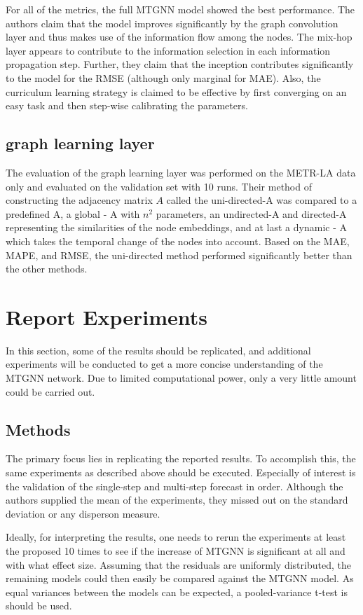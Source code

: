 \documentclass[letterpaper, twocolumn,11pt]{article}
\begin{document}
    For all of the metrics, the full MTGNN model showed the best performance.
    The authors claim that the model improves significantly by the graph convolution layer and thus makes use of the information flow among the nodes.
    The mix-hop layer appears to contribute to the information selection in each information propagation step.
    Further, they claim that the inception contributes significantly to the model for the RMSE (although only marginal for MAE).
    Also, the curriculum learning strategy is claimed to be effective by first converging on an easy task and then step-wise calibrating the parameters.

    \subsection{graph learning layer}
    The evaluation of the graph learning layer was performed on the METR-LA data only and evaluated on the validation set with 10 runs.
    Their method of constructing the adjacency matrix $A$ called the uni-directed-A was compared to a predefined A, a global - A with $n^2$ parameters, an undirected-A and directed-A representing the similarities of the node embeddings, and at last a dynamic - A which takes the temporal change of the nodes into account.
    Based on the MAE, MAPE, and RMSE, the uni-directed method performed significantly better than the other methods.


    \section{Report Experiments}
    In this section, some of the results should be replicated, and additional experiments will be conducted to get a more concise understanding of the MTGNN network.
    Due to limited computational power, only a very little amount could be carried out.

    \subsection{Methods}
    The primary focus lies in replicating the reported results.
    To accomplish this, the same experiments as described above should be executed.
    Especially of interest is the validation of the single-step and multi-step forecast in order.
    Although the authors supplied the mean of the experiments, they missed out on the standard deviation or any disperson measure.

    Ideally, for interpreting the results, one needs to rerun the experiments at least the proposed 10 times to see if the increase of MTGNN is significant at all and with what effect size.
    Assuming that the residuals are uniformly distributed, the remaining models could then easily be compared against the MTGNN model. As equal variances between the models can be expected, a pooled-variance t-test is should be used.
\end{document}
